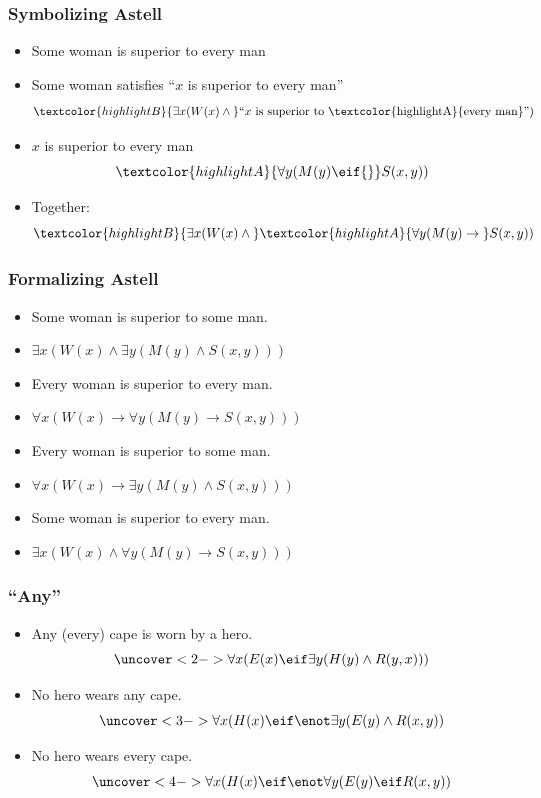 \begin{frame}
    \frametitle{Symbolizing Astell}

\begin{itemize}[<+->]
\item \textcolor{highlightB}{ Some woman} is superior to \textcolor{highlightA}{ every man}
\item \textcolor{highlightB}{ Some woman} satisfies ``$x$ is superior to
\textcolor{highlightA}{ every man}''
\[\textcolor{highlightB}{\exists x(W(x) \land {}}\text{``$x$ is superior to \textcolor{highlightA}{every man}''})\]
\item $x$ is superior to \textcolor{highlightA}{ every man}
\[
\textcolor{highlightA}{\forall y(M(y) \eif {}}S(x, y))
\]
\item Together:
\[
\textcolor{highlightB}{\exists x(W(x) \land{}} \textcolor{highlightA}{\forall y(M(y) \to {}}S(x, y))
\]
\end{itemize}
\end{frame}

\newhourlecture

\begin{frame}
    \frametitle{Formalizing Astell}

\begin{itemize}[<+->]
\item Some woman is superior to some man.
\item[] \alert{$\exists x(W(x) \land \exists y(M(y) \land S(x, y)))$}
\item Every woman is superior to every man.
\item[] \alert{$\forall x(W(x) \to \forall y(M(y) \to S(x, y)))$}
\item Every woman is superior to some man.
\item[]\alert{$\forall x(W(x) \to \exists y(M(y) \land S(x, y)))$}
\item Some woman is superior to every man.
\item[] \alert{$\exists x(W(x) \land \forall y(M(y) \to S(x, y)))$}
\end{itemize}
\end{frame}

\begin{frame}
    \frametitle{``Any''}

\begin{itemize}[<+->]
\item Any (every) cape is worn by a hero.
\[
\uncover<2->{\forall x(E(x) \eif \exists y(H(y) \land R(y, x)))}
\]\pause
\item No hero wears any cape.
\[
\uncover<3->{\forall x(H(x) \eif \enot\exists y(E(y) \land R(x, y))}
\]
\item No hero wears every cape.
\[
\uncover<4->{\forall x(H(x) \eif \enot\forall y(E(y) \eif R(x, y))}
\]
\end{itemize}
\end{frame}




